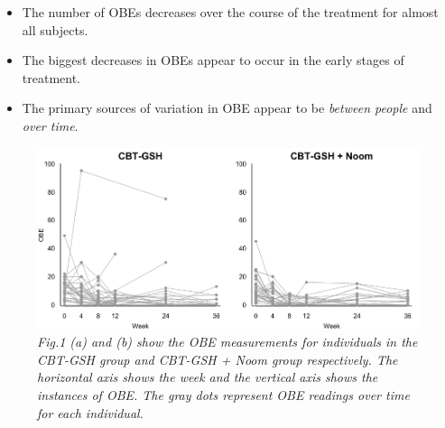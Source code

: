 \documentclass{article}
\begin{document}
\begin{itemize}
\item{The number of OBEs decreases over the course of the treatment for almost all subjects.}
\item{The biggest decreases in OBEs appear to occur in the early stages of treatment.}
\item{The primary sources of variation in OBE appear to be \emph{between people} and \emph{over time}.}
\end{itemize}
%
\begin{figure}[H]
   \begin{center}
\includegraphics[width=\textwidth, height=\textheight, keepaspectratio]{Noom_paths.png}
   \end{center}
\caption{\emph{Fig.1 (a) and (b) show the OBE measurements for individuals in the CBT-GSH group and CBT-GSH + Noom group respectively. The horizontal axis shows the week and the vertical axis shows the instances of OBE. The gray dots represent OBE readings over time for each individual. }}
\end{figure}
%
\end{document}

